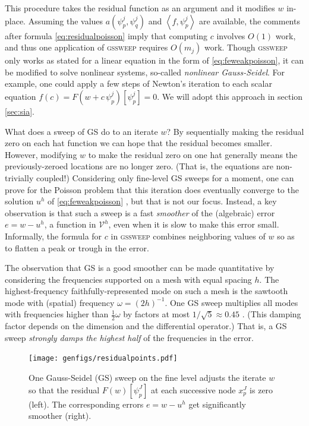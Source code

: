 \documentclass[letterpaper,final,12pt,reqno]{amsart}
\theoremstyle{claim}
\newcommand{\ip}[2]{\left<#1,#2\right>}
\numberwithin{equation}{section}
\numberwithin{figure}{section}
\numberwithin{table}{section}
\numberwithin{theorem}{section}
\begin{document}
This procedure takes the residual function as an argument and it modifies $w$ in-place.  Assuming the values $a(\psi_p^j,\psi_q^j)$ and $\ip{f}{\psi_p^j}$ are available, the comments after formula \eqref{eq:residualpoisson} imply that computing $c$ involves $O(1)$ work, and thus one application of \textsc{gssweep} requires $O(m_j)$ work.  Though \textsc{gssweep} only works as stated for a linear equation in the form of \eqref{eq:feweakpoisson}, it can be modified to solve nonlinear systems, so-called \emph{nonlinear Gauss-Seidel}.  For example, one could apply a few steps of Newton's iteration to each scalar equation $f(c) = F(w+c\,\psi_p^j)[\psi_p^j] = 0$.  We will adopt this approach in section \ref{sec:sia}.

What does a sweep of GS do to an iterate $w$?  By sequentially making the residual zero on each hat function we can hope that the residual becomes smaller.  However, modifying $w$ to make the residual zero on one hat generally means the previously-zeroed locations are no longer zero.  (That is, the equations are non-trivially coupled!)  Considering only fine-level GS sweeps for a moment, one can prove for the Poisson problem that this iteration does eventually converge to the solution $u^h$ of \eqref{eq:feweakpoisson} \cite[for example]{Greenbaum1997}, but that is not our focus.  Instead, a key observation is that such a sweep is a fast \emph{smoother} of the (algebraic) error $e=w-u^h$, a function in $\mathcal{V}^h$, even when it is slow to make this error small.  Informally, the formula for $c$ in \textsc{gssweep} combines neighboring values of $w$ so as to flatten a peak or trough in the error.

The observation that GS is a good smoother can be made quantitative by considering the frequencies supported on a mesh with equal spacing $h$.  The highest-frequency faithfully-represented mode on such a mesh is the sawtooth mode with (spatial) frequency $\omega=(2h)^{-1}$.  One GS sweep multiplies all modes with frequencies higher than $\frac{1}{2} \omega$ by factors at most $1/\sqrt{5}\approx 0.45$ \cite[Chapter 4]{Briggsetal2000}.  (This damping factor depends on the dimension and the differential operator.)  That is, a GS sweep \emph{strongly damps the highest half} of the frequencies in the error.

\begin{figure}[t]
\texttt{[image: genfigs/residualpoints.pdf]}
\caption{One Gauss-Seidel (GS) sweep on the fine level adjusts the iterate $w$ so that the residual $F(w)[\psi_p^J]$ at each successive node $x_p^J$ is zero (left).  The corresponding errors $e=w-u^h$ get significantly smoother (right).}
\label{fig:residualpoints}
\end{figure}
\end{document}
